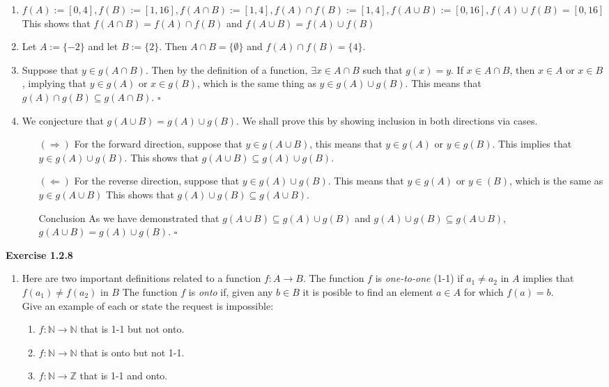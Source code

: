 \documentclass[12 pt]{article}
\newcommand{\qed}[0]{$\square$}
\begin{document}
\begin{enumerate}
    \item \(f(A) := [0, 4], f(B) := [1, 16], f(A \cap B) := [1, 4], f(A) \cap f(B) := [1, 4], f(A\cup B) := [0, 16], f(A) \cup f(B) = [0, 16]\)
    \\
    This shows that \(f(A \cap B) = f(A) \cap f(B)\) and \(f(A \cup B) = f(A) \cup f(B)\)

    \item Let \(A := \{-2\}\) and let \(B := \{2\}\). Then \(A \cap B = \{\emptyset\}\) and \(f(A) \cap f(B) = \{4\}\).
    \item Suppose that \(y \in g(A \cap B)\). Then by the definition of a function, \(\exists x \in A \cap B\) such that \(g(x) = y\). If \(x \in A \cap B\), then \(x \in A\) or \(x \in B\), implying that \(y \in g(A)\) or \(x \in g(B)\), which is the same thing as \(y \in g(A) \cup g(B)\). This means that \(g(A) \cap g(B) \subseteq g(A \cap B)\). \qed 
    \item We conjecture that \(g(A \cup B) = g(A) \cup g(B)\). We shall prove this by showing inclusion in both directions via cases.
    \begin{enumerate}
        \item[\((\Rightarrow)\)] For the forward direction, suppose that \(y \in g(A \cup B)\), this means that \(y \in g(A)\) or \(y \in g(B)\). This implies that \(y \in g(A) \cup g(B)\). This shows that \(g(A \cup B) \subseteq g(A) \cup g(B)\).
        \item[\((\Leftarrow)\)] For the reverse direction, suppose that \(y \in g(A) \cup g(B)\). This means that \(y \in g(A)\) or \(y \in (B)\), which is the same as \(y \in g(A \cup B)\) This shows that \(g(A) \cup g(B) \subseteq g(A \cup B)\).
        \item[Conclusion] As we have demonstrated that \(g(A \cup B) \subseteq g(A) \cup g(B)\) and \(g(A) \cup g(B) \subseteq g(A \cup B)\), \(g(A \cup B) = g(A) \cup g(B)\). \qed
    \end{enumerate}
\end{enumerate}
\textbf{Exercise 1.2.8}
\begin{enumerate}
    \item Here are two important definitions related to a function \(f \colon A \to B\). The function \(f\) is \textit{one-to-one} (1-1) if \(a_{1} \neq a_{2}\) in \(A\) implies that \(f(a_{1}) \neq f(a_{2})\) in \(B\) The function \(f\) is \textit{onto} if, given any \(b \in B\) it is posible to find an element \(a \in A\) for which \(f(a) = b\).
    \\
    Give an example of each or state the request is impossible:
    \begin{enumerate}
    \item \(f \colon \mathbb{N} \to \mathbb{N}\) that is 1-1 but not onto.
    \item \(f \colon \mathbb{N} \to \mathbb{N}\) that is onto but not 1-1.
    \item \(f \colon \mathbb{N} \to \mathbb{Z}\) that is 1-1 and onto.
    \end{enumerate}
\end{enumerate}
\end{document}
